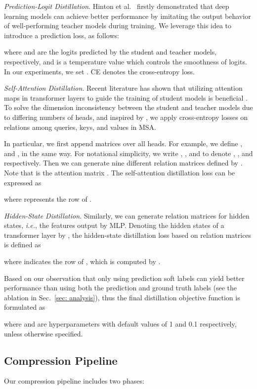 \documentclass[10pt,twocolumn,letterpaper]{article}
\begin{document}
\textit{Prediction-Logit Distillation}. Hinton et al.~\cite{distill_hinton} firstly demonstrated that deep learning models can achieve better performance by imitating the output behavior of well-performing teacher models during training.
We leverage this idea to introduce a prediction loss, as follows:
    
where  and  are the logits predicted by the student and teacher models, respectively, and  is a temperature value which controls the smoothness of logits. In our experiments, we set . CE denotes the cross-entropy loss.
    
\textit{Self-Attention Distillation}. 
Recent literature has shown that utilizing attention maps in transformer layers to guide the training of student models is beneficial \cite{Albert, tinybert, mobilebert}. To solve the dimension inconsistency between the student and teacher models due to differing numbers of heads, and inspired by \cite{minilmv2}, we apply cross-entropy losses on relations among queries, keys, and values in MSA. 

In particular, we first append matrices over all heads. For example, we define , and ,  in the same way. For notational simplicity, we write , , and  to denote , , and  respectively. Then we can generate nine different relation matrices defined by . Note that  is the attention matrix . The self-attention distillation loss can be expressed as
    \vspace{-2mm}
    
    where  represents the  row of . 
    
\textit{Hidden-State Distillation.} Similarly, we can generate relation matrices for hidden states, \emph{i.e.}, the features output by MLP. Denoting the hidden states of a transformer layer by , the hidden-state distillation loss based on relation matrices is defined as
    
    where  indicates the  row of , which is  computed by .

    Based on our observation that only using prediction soft labels can yield better performance than using both the prediction and ground truth labels 
    (see the ablation in Sec.~\textcolor{red}{\ref{sec: analysis}}), thus the final distillation objective function is formulated as
    \vspace{-4mm}
    
    where  and  are hyperparameters with default values 
    of 1 and 0.1 respectively, unless otherwise specified.
    
\subsection{Compression Pipeline}
Our compression pipeline includes two phases:
\end{document}
